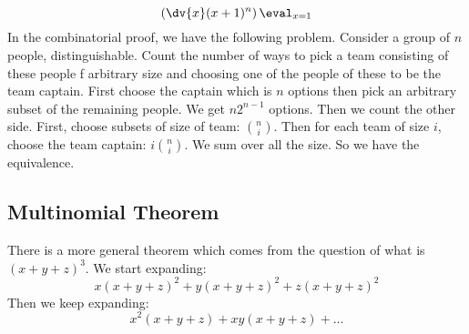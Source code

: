 \documentclass{report}
\begin{document}
\begin{examples}
\begin{example}
\begin{equation*}
                \left(\dv{x}(x + 1)^{n}\right)\eval_{x = 1}
            \end{equation*}
        In the combinatorial proof, we have the following problem. Consider a group of $n$ people, distinguishable. Count the number of ways to pick a team consisting of these people f arbitrary size and choosing one of the people of these to be the team captain. First choose the captain which is $n$ options then pick an arbitrary subset of the remaining people. We get $n2^{n - 1}$ options. Then we count the other side. First, choose subsets of size of team: $\binom{n}{i}$. Then for each team of size $i$, choose the team captain: $i\binom{n}{i}$. We sum over all the size. So we have the equivalence.
    \end{example}
\end{examples}

\begin{topic}
    \section{Multinomial Theorem}
\end{topic}

There is a more general theorem which comes from the question of what is $(x + y + z)^{3}$. We start expanding:
    \begin{equation*}
        x(x + y + z)^{2} + y(x + y + z)^{2} + z(x + y + z)^{2}
    \end{equation*}
Then we keep expanding:
    \begin{equation*}
        x^{2}(x + y + z) + xy(x + y + z) + \ldots
    \end{equation*}
\end{document}
